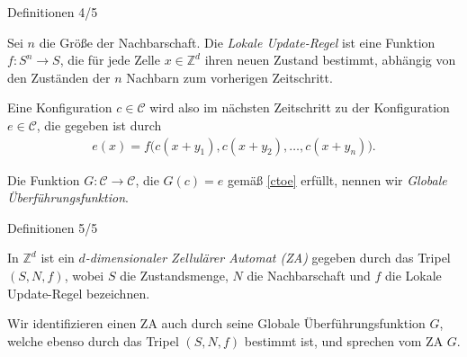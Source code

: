 \documentclass[aspectratio=169]{beamer}
\begin{document}
    \begin{frame}{Definitionen 4/5}
      \begin{definition*}
        Sei $n$ die Größe der Nachbarschaft. Die \textit{Lokale Update-Regel} ist eine Funktion $f: S^n \to S$, die für jede Zelle $x \in \mathbb{Z}^d$ ihren neuen Zustand bestimmt, abhängig von den Zuständen der $n$ Nachbarn zum vorherigen Zeitschritt.
      \end{definition*}

      \pause

      Eine Konfiguration $c \in \mathcal{C}$ wird also im nächsten Zeitschritt zu der Konfiguration $e \in \mathcal{C}$, die gegeben ist durch
      \begin{align}\label{ctoe}
        e(x) = f \big(c(x+y_1), c(x+y_2), \dots, c(x+y_n)\big).
      \end{align}

      \pause

      \begin{definition*}
        Die Funktion $G: \mathcal{C} \to \mathcal{C}$, die $G(c)=e$ gemäß \eqref{ctoe} erfüllt, nennen wir \textit{Globale Überführungsfunktion}.
      \end{definition*}

    \end{frame}



  \begin{frame}{Definitionen 5/5}
    \begin{definition*}
      In $\mathbb{Z}^d$ ist ein \textit{$d$-dimensionaler Zellulärer Automat (ZA)} gegeben durch das Tripel $(S,N,f)$, wobei $S$ die Zustandsmenge, $N$ die Nachbarschaft und $f$ die Lokale Update-Regel bezeichnen.
    \end{definition*}

    \pause

    \begin{remark*}
      Wir identifizieren einen ZA auch durch seine Globale Überführungsfunktion $G$, welche ebenso durch das Tripel $(S,N,f)$ bestimmt ist, und sprechen vom ZA $G$.
    \end{remark*}

  \end{frame}
\end{document}
